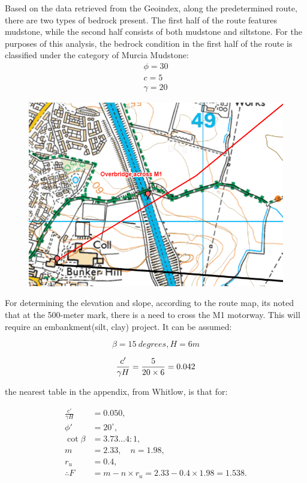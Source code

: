 \documentclass[letterpaper,12pt,leqno]{article}
\begin{document}
	Based on the data retrieved from the Geoindex, along the predetermined
	route, there are two types of bedrock present. The first half of the
	route features mudstone, while the second half consists of both mudstone
	and siltstone. For the purposes of this analysis, the bedrock condition
	in the first half of the route is classified under the category of
	Murcia Mudstone:
	\begin{align*}
	\phi=30\\
	c=5\\
	\gamma=20
	\end{align*}
	\begin{figure}[H]
		\centering
		\includegraphics[width=0.8\linewidth]{figure/bridge.png}
		\label{fig:bridge}
	\end{figure}
	
	For determining the elevation and slope, according to the route map,
	it\textquotesingle s noted that at the 500-meter mark, there is a need
	to cross the M1 motorway. This will require an embankment(silt, clay)
	project. It can be assumed:
	
	\[\beta = 15\ degrees,H = 6m\]
	
	\[\frac{c'}{\gamma H} = \frac{5}{20 \times 6} = 0.042\\\]
	
	the nearest table in the appendix, from Whitlow, is that for:
	
	\begin{align*}
		\frac{c'}{\gamma H} &= 0.050, \\
		\phi' &= 20^\circ, \\
		\cot \beta &= 3.73 \text{...} 4:1, \\
		m &= 2.33, \quad n = 1.98, \\
		r_u &= 0.4, \\
		\therefore  F &= m - n \times r_u = 2.33 - 0.4 \times 1.98 = 1.538.
	\end{align*}
	
\end{document}
